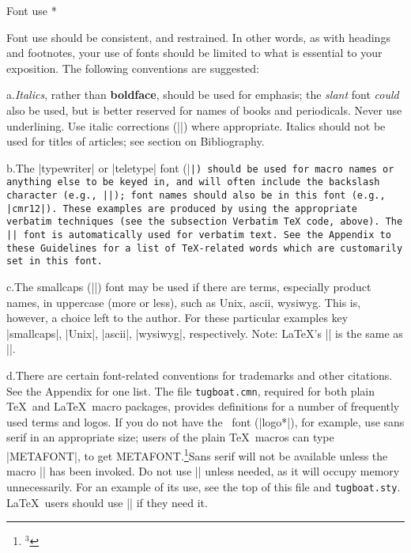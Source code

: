 \subhead * Font use *
 
Font use should be consistent, and restrained.  In other words, as
with headings and footnotes, your use of fonts should be limited to
what is essential to your exposition.  The following conventions are
suggested:
 
\smallskip
 
\item{a.}{\it Italics}, rather than {\bf boldface}, should be used for
   emphasis; the {\sl slant\/} font {\it could\/} also be used, but is
better reserved for names of books and periodicals.  Never use
underlining.  Use italic corrections (|\/|) where appropriate.
Italics should not be used for titles of articles; see section on
Bibliography.
 
\item{b.}The |typewriter| or |teletype| font (|\tt|) should be used for
   macro names or anything else to be keyed in, and will often include
the backslash character (e.g., |\entry|); font names should also be in
this font (e.g., |cmr12|).  These examples are produced by using the
appropriate verbatim techniques (see the subsection Verbatim \TeX\
code, above). The |\tt| font is automatically used for verbatim text.
See the Appendix to these Guidelines for a list of \TeX-related words
which are customarily set in this font.
 
\item{c.}The {\smc smallcaps} (|\smc|) font may be used if there are
   terms, especially product names, in uppercase (more or less), such as
   {\smc Unix}, {\smc ascii}, {\smc wysiwyg}.  This is, however, a choice
   left to the author.  For these particular examples key |{\smc smallcaps}|,
   |{\smc Unix}|, |{\smc ascii}|, |{\smc wysiwyg}|, respectively.
   Note: \LaTeX's |\sc| is the same as |\smc|.
 
\item{d.}There are certain font-related conventions for trademarks and
   other citations.  See the Appendix for one list. The file
   {\tt tugboat.cmn}, required for both plain \TeX\ and \LaTeX\ macro
   packages, provides definitions for a number of frequently used terms
   and logos.  If you do not have the \MF\ font (|logo*|), for example,
   use sans serif in an appropriate size; users of the plain \TeX\
   macros can type |{\niness METAFONT}|, to get {\niness
   METAFONT}.\footnote{$^3$}{Sans serif will not
   be available unless the macro |\LoadSansFonts| has been invoked.
   Do not use |\LoadSansFonts| unless needed, as it will occupy memory
   unnecessarily. For an example of its use, see the top of this file
   and {\tt tugboat.sty}.} \LaTeX\ users should use |\sf| if they need it.
 
